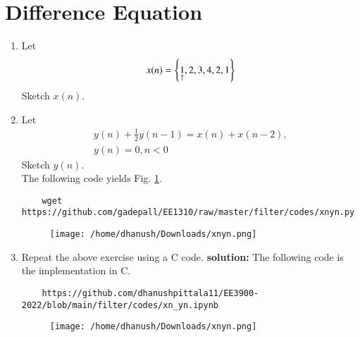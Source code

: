 \documentclass[journal,12pt,twocolumn]{IEEEtran}
\renewcommand\thesection{\arabic{section}}
\begin{document}
\section{Difference Equation}
\begin{enumerate}[label=\thesection.\arabic*,ref=\thesection.\theenumi]
\item Let
\label{def:xn}
\begin{equation}
	x(n) = \left\{\underset{\uparrow}{1},2,3,4,2,1\right\}
\end{equation}
Sketch $x(n)$.
\item Let
\begin{multline}
	\label{eq:iir_filter}
	y(n) + \frac{1}{2}y(n-1) = x(n) + x(n-2), 
	\\
	y(n) = 0, n < 0
\end{multline}
Sketch $y(n)$.  
\\
\solution The following code yields Fig. \ref{fig:xnyn}.
\begin{lstlisting}
	wget https://github.com/gadepall/EE1310/raw/master/filter/codes/xnyn.py
\end{lstlisting}
\begin{figure}[!ht]
	\begin{center}
		\texttt{[image: /home/dhanush/Downloads/xnyn.png]}
	\end{center}
	\label{fig:xnyn}	
\end{figure}
\item Repeat the above exercise using a C code.
\textbf{solution: } The following code is the implementation in C.

\begin{lstlisting}
	https://github.com/dhanushpittala11/EE3900-2022/blob/main/filter/codes/xn_yn.ipynb
\end{lstlisting}

\begin{figure}[!h]
	\begin{center}
		\texttt{[image: /home/dhanush/Downloads/xnyn.png]}
	\end{center}
	\label{fig:xnyn_2}	
\end{figure}

\end{enumerate}
\end{document}
